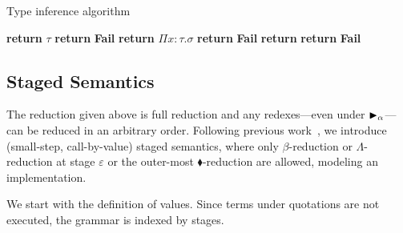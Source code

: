 \begin{algorithm}
    \caption{Type inference algorithm}\label{alg:type-inference}
    \begin{algorithmic}[1]
        \State \textbf{return} $\tau$
        \Else
        \State \textbf{return} \textbf{Fail}
        \EndIf
        \State \textbf{return} $\Pi x:\tau.\sigma$
        \Else
        \State \textbf{return} \textbf{Fail}
        \EndIf
        \State \textbf{return} 
        \Else
        \State \textbf{return} \textbf{Fail}
        \EndIf
        \State {}
        \EndIf
        \EndProcedure
    \end{algorithmic}
\end{algorithm}

\subsection{Staged Semantics}

The reduction given above is full reduction and any redexes---even under
${\mathop{\blacktriangleright}}_\alpha$---can be reduced in an arbitrary order.  Following previous
work~\cite{HanadaIgarashi2014CSP}, we introduce (small-step, call-by-value) staged
semantics, where only $\beta$-reduction or $\Lambda$-reduction at stage
$\varepsilon$ or the outer-most $\blacklozenge$-reduction are allowed, modeling
an implementation.

We start with the definition of values. Since terms under quotations are
not executed, the grammar is indexed by stages.

